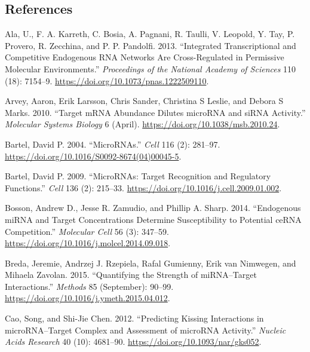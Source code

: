 \documentclass[]{article}
\begin{document}
\hypertarget{references}{%
\subsection*{References}\label{references}}

\hypertarget{refs}{}
\leavevmode\hypertarget{ref-ala_integrated_2013}{}%
Ala, U., F. A. Karreth, C. Bosia, A. Pagnani, R. Taulli, V. Leopold, Y.
Tay, P. Provero, R. Zecchina, and P. P. Pandolfi. 2013. ``Integrated
Transcriptional and Competitive Endogenous RNA Networks Are
Cross-Regulated in Permissive Molecular Environments.''
\emph{Proceedings of the National Academy of Sciences} 110 (18):
7154--9. \url{https://doi.org/10.1073/pnas.1222509110}.

\leavevmode\hypertarget{ref-arvey_target_2010}{}%
Arvey, Aaron, Erik Larsson, Chris Sander, Christina S Leslie, and Debora
S Marks. 2010. ``Target mRNA Abundance Dilutes microRNA and siRNA
Activity.'' \emph{Molecular Systems Biology} 6 (April).
\url{https://doi.org/10.1038/msb.2010.24}.

\leavevmode\hypertarget{ref-bartel_micrornas_2004}{}%
Bartel, David P. 2004. ``MicroRNAs.'' \emph{Cell} 116 (2): 281--97.
\url{https://doi.org/10.1016/S0092-8674(04)00045-5}.

\leavevmode\hypertarget{ref-bartel_micrornas:_2009}{}%
Bartel, David P. 2009. ``MicroRNAs: Target Recognition and Regulatory
Functions.'' \emph{Cell} 136 (2): 215--33.
\url{https://doi.org/10.1016/j.cell.2009.01.002}.

\leavevmode\hypertarget{ref-bosson_endogenous_2014}{}%
Bosson, Andrew D., Jesse R. Zamudio, and Phillip A. Sharp. 2014.
``Endogenous miRNA and Target Concentrations Determine Susceptibility to
Potential ceRNA Competition.'' \emph{Molecular Cell} 56 (3): 347--59.
\url{https://doi.org/10.1016/j.molcel.2014.09.018}.

\leavevmode\hypertarget{ref-breda_quantifying_2015}{}%
Breda, Jeremie, Andrzej J. Rzepiela, Rafal Gumienny, Erik van Nimwegen,
and Mihaela Zavolan. 2015. ``Quantifying the Strength of miRNA--Target
Interactions.'' \emph{Methods} 85 (September): 90--99.
\url{https://doi.org/10.1016/j.ymeth.2015.04.012}.

\leavevmode\hypertarget{ref-cao_predicting_2012}{}%
Cao, Song, and Shi-Jie Chen. 2012. ``Predicting Kissing Interactions in
microRNA--Target Complex and Assessment of microRNA Activity.''
\emph{Nucleic Acids Research} 40 (10): 4681--90.
\url{https://doi.org/10.1093/nar/gks052}.
\end{document}
